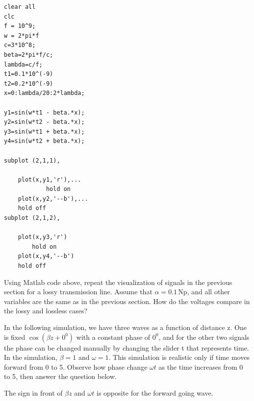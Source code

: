 \documentclass{ximera}
\begin{document}
\begin{example}
\begin{explanation}
\begin{verbatim}
clear all
clc
f = 10^9;
w = 2*pi*f
c=3*10^8;
beta=2*pi*f/c;
lambda=c/f;
t1=0.1*10^(-9)
t2=0.2*10^(-9)
x=0:lambda/20:2*lambda;

y1=sin(w*t1 - beta.*x);
y2=sin(w*t2 - beta.*x);
y3=sin(w*t1 + beta.*x);
y4=sin(w*t2 + beta.*x);

subplot (2,1,1),

    plot(x,y1,'r'),...
            hold on
    plot(x,y2,'--b'),...
    hold off
subplot (2,1,2),

    plot(x,y3,'r')
        hold on
    plot(x,y4,'--b')
    hold off
\end{verbatim}

Using Matlab code above, repeat the visualization of signals in the previous section for a lossy transmission line. Assume that $\alpha=0.1$\,Np, and all other variables are the same as in the previous section. How do the voltages compare in the lossy and lossless cases?
\end{explanation}
\end{example}



\begin{question}
In the following simulation, we have three waves as a function of distance z. One is fixed $\cos (\beta z +0^0)$ with a constant phase of $0^0$, and for the other two signals the phase can be changed manually by changing the slider t that represents time. In the simulation, $\beta=1$ and $\omega=1$. This simulation is realistic only if time moves forward from 0 to 5.  Observe how phase change $\omega t$ as the time increases from 0 to 5, then answer the question below. 

\begin{center}  
\end{center} 
The sign in front of $ \beta z $ and $\omega t$ is opposite for the forward going wave.
\begin{multipleChoice}  
\end{multipleChoice}  


\end{question}
\end{document}
